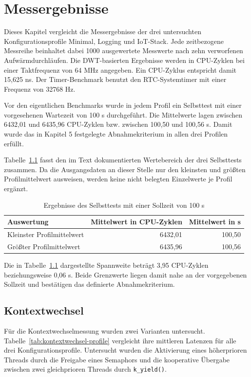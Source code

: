\chapter{Messergebnisse}
\label{ch:messergebnisse}

Dieses Kapitel vergleicht die Messergebnisse der drei untersuchten Konfigurationsprofile Minimal, Logging und IoT-Stack. Jede zeitbezogene Messreihe beinhaltet dabei 1000 ausgewertete Messwerte nach zehn verworfenen Aufw{\"a}rmdurchl{\"a}ufen. Die DWT-basierten Ergebnisse werden in CPU-Zyklen bei einer Taktfrequenz von 64 MHz angegeben. Ein CPU-Zyklus entspricht damit 15,625 ns. Der Timer-Benchmark benutzt den RTC-Systemtimer mit einer Frequenz von 32768 Hz.

Vor den eigentlichen Benchmarks wurde in jedem Profil ein Selbsttest mit einer vorgesehenen Wartezeit von 100 \textmu{}s durchgef{\"u}hrt. Die Mittelwerte lagen zwischen 6432,01 und 6435,96 CPU-Zyklen bzw. zwischen 100,50 und 100,56 \textmu{}s. Damit wurde das in Kapitel 5 festgelegte Abnahmekriterium in allen drei Profilen erf{\"u}llt.

Tabelle~\ref{tab:selbsttest-100us} fasst den im Text dokumentierten Wertebereich der drei Selbsttests zusammen. Da die Ausgangsdaten an dieser Stelle nur den kleinsten und gr{\"o}{\ss}ten Profilmittelwert ausweisen, werden keine nicht belegten Einzelwerte je Profil erg{\"a}nzt.

\begin{table}[H]
\centering
\caption{Ergebnisse des Selbsttests mit einer Sollzeit von 100 \textmu{}s}
\label{tab:selbsttest-100us}
\begin{tabular}{lrr}
\toprule
Auswertung & Mittelwert in CPU-Zyklen & Mittelwert in \textmu{}s \\
\midrule
Kleinster Profilmittelwert & 6432,01 & 100,50 \\
Gr{\"o}{\ss}ter Profilmittelwert & 6435,96 & 100,56 \\
\bottomrule
\end{tabular}
\end{table}

Die in Tabelle~\ref{tab:selbsttest-100us} dargestellte Spannweite betr{\"a}gt 3,95 CPU-Zyklen beziehungsweise 0,06 \textmu{}s. Beide Grenzwerte liegen damit nahe an der vorgegebenen Sollzeit und best{\"a}tigen das definierte Abnahmekriterium.

\section{Kontextwechsel}
F{\"u}r die Kontextwechselmessung wurden zwei Varianten untersucht. Tabelle~\ref{tab:kontextwechsel-profile} vergleicht ihre mittleren Latenzen f{\"u}r alle drei Konfigurationsprofile. Untersucht wurden die Aktivierung eines h{\"o}herprioren Threads durch die Freigabe eines Semaphors und die kooperative {\"U}bergabe zwischen zwei gleichprioren Threads durch \lstinline[style=codeinline]|k_yield()|.

